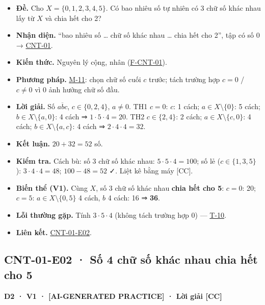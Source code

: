 \documentclass[
  10pt,
  twoside,openany]{book}
\providecommand{\tightlist}{%
  \setlength{\itemsep}{0pt}\setlength{\parskip}{0pt}}
\begin{document}
\begin{itemize}
\tightlist
\item
  \textbf{Đề.} Cho \(X=\{0,1,2,3,4,5\}\). Có bao nhiêu số tự nhiên có 3
  chữ số khác nhau lấy từ \(X\) và chia hết cho 2?
\item
  \textbf{Nhận diện.} ``bao nhiêu số \ldots{} chữ số khác nhau \ldots{}
  chia hết cho 2'', tập có số 0 → \protect\hyperlink{CNT-01}{CNT-01}.
\item
  \textbf{Kiến thức.} Nguyên lý cộng, nhân
  (\protect\hyperlink{F-CNT-01}{F-CNT-01}).
\item
  \textbf{Phương pháp.} \protect\hyperlink{M-11}{M-11}: chọn chữ số cuối
  \(c\) trước; tách trường hợp \(c=0\) / \(c\ne0\) vì 0 ảnh hưởng chữ số
  đầu.
\item
  \textbf{Lời giải.} Số \(\overline{abc}\), \(c\in\{0,2,4\}\),
  \(a\ne0\). TH1 \(c=0\): \(c\): 1 cách; \(a\in X\setminus\{0\}\): 5
  cách; \(b\in X\setminus\{a,0\}\): 4 cách ⇒ \(1\cdot5\cdot4=20\). TH2
  \(c\in\{2,4\}\): 2 cách; \(a\in X\setminus\{c,0\}\): 4 cách;
  \(b\in X\setminus\{a,c\}\): 4 cách ⇒ \(2\cdot4\cdot4=32\).
\item
  \textbf{Kết luận.} \(20+32=52\) số.
\item
  \textbf{Kiểm tra.} Cách bù: số 3 chữ số khác nhau:
  \(5\cdot5\cdot4=100\); số lẻ (\(c\in\{1,3,5\}\)):
  \(3\cdot4\cdot4=48\); \(100-48=52\) ✓. Liệt kê bằng máy {[}CC{]}.
\item
  \textbf{Biến thể (V1).} Cùng \(X\), số 3 chữ số khác nhau \textbf{chia
  hết cho 5}: \(c=0\): 20; \(c=5\): \(a\in X\setminus\{0,5\}\) 4 cách,
  \(b\) 4 cách: 16 ⇒ \textbf{36}.
\item
  \textbf{Lỗi thường gặp.} Tính \(3\cdot5\cdot4\) (không tách trường hợp
  0) --- \protect\hyperlink{T-10}{T-10}.
\item
  \textbf{Liên kết.} \protect\hyperlink{CNT-01-E02}{CNT-01-E02}.
\end{itemize}

\hypertarget{CNT-01-E02}{%
\subsection{CNT-01-E02 · Số 4 chữ số khác nhau chia hết cho
5}\label{CNT-01-E02}}

\textbf{D2 · V1 · {[}AI-GENERATED PRACTICE{]} · Lời giải {[}CC{]}}
\end{document}
